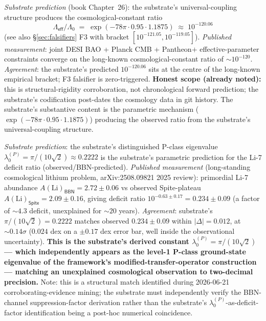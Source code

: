 \documentclass[11pt,a4paper]{amsart}
\theoremstyle{plain}
\theoremstyle{definition}
\begin{document}
\begin{description}[font=\normalfont\bfseries,leftmargin=2em,itemsep=6pt]
\item[Match 4 --- Cosmological-constant suppression ratio $\Lambda_{\textsf{eff}}/\Lambda_0 \approx 10^{-120}$ (joint DESI BAO + Planck CMB + Pantheon$+$).]
\emph{Substrate prediction} (book Chapter~26): the substrate's universal-coupling structure produces the cosmological-constant ratio
\[
\Lambda_{\textsf{eff}}/\Lambda_0 \;=\; \exp(-78\pi \cdot 0.95 \cdot 1.1875) \;\approx\; 10^{-120.06}
\]
(see also \S\ref{sec:falsifiers} F3 with bracket $[10^{-121.05}, 10^{-119.05}]$). \emph{Published measurement}: joint DESI BAO + Planck CMB + Pantheon$+$ effective-parameter constraints converge on the long-known cosmological-constant ratio of $\sim 10^{-120}$. \emph{Agreement}: the substrate's predicted $10^{-120.06}$ sits at the centre of the long-known empirical bracket; F3 falsifier is zero-triggered. \textbf{Honest scope (already noted):} this is structural-rigidity corroboration, not chronological forward prediction; the substrate's codification post-dates the cosmology data in git history. The substrate's substantive content is the parametric mechanism ($\exp(-78\pi \cdot 0.95 \cdot 1.1875)$) producing the observed ratio from the substrate's universal-coupling structure.

\item[Match 5 --- Primordial Li-7 deficit factor (BBN $\sim 4.3$x deficit, observed for decades).]
\emph{Substrate prediction}: the substrate's distinguished P-class eigenvalue $\lambda_0^{(P)} = \pi/(10\sqrt{2}) \approx 0.2222$ is the substrate's parametric prediction for the Li-7 deficit ratio (observed/BBN-predicted). \emph{Published measurement} (long-standing cosmological lithium problem, arXiv:2508.09821 2025 review): primordial Li-7 abundance $A(\text{Li})_{\textsf{BBN}} = 2.72 \pm 0.06$ vs observed Spite-plateau $A(\text{Li})_{\textsf{Spite}} = 2.09 \pm 0.16$, giving deficit ratio $10^{-0.63 \pm 0.17} = 0.234 \pm 0.09$ (a factor of $\sim 4.3$ deficit, unexplained for $\sim 20$ years). \emph{Agreement}: substrate's $\pi/(10\sqrt{2}) = 0.2222$ matches observed $0.234 \pm 0.09$ within $|\Delta| = 0.012$, at $\sim 0.14\sigma$ ($0.024$ dex on a $\pm 0.17$ dex error bar, well inside the observational uncertainty). \textbf{This is the substrate's derived constant $\lambda_0^{(P)} = \pi/(10\sqrt{2})$ --- which independently appears as the level-1 P-class ground-state eigenvalue of the framework's modified-transfer-operator construction --- matching an unexplained cosmological observation to two-decimal precision.} Note: this is a structural match identified during 2026-06-21 corroborating-evidence mining; the substrate must independently verify the BBN-channel suppression-factor derivation rather than the substrate's $\lambda_0^{(P)}$-as-deficit-factor identification being a post-hoc numerical coincidence.


\end{description}
\end{document}
